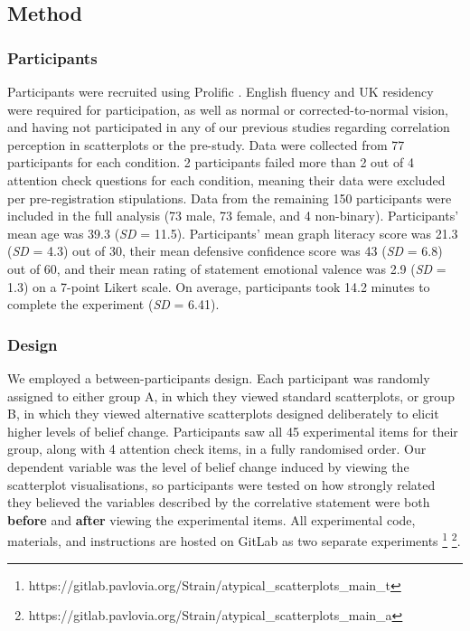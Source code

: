 \documentclass[sigconf]{acmart}
\begin{document}
\subsection{Method}\label{sec-method-main}

\subsubsection{Participants}\label{sec-participants-main}

Participants were recruited using Prolific \citep{prolific}. English
fluency and UK residency were required for participation, as well as
normal or corrected-to-normal vision, and having not participated in any
of our previous studies regarding correlation perception in scatterplots
\citep{strain_2023, strain_2023b, strain_2024} or the pre-study. Data
were collected from 77 participants for each condition. 2 participants
failed more than 2 out of 4 attention check questions for each
condition, meaning their data were excluded per pre-registration
stipulations. Data from the remaining 150 participants were included in
the full analysis (73 male, 73 female, and 4 non-binary). Participants'
mean age was 39.3 (\emph{SD} = 11.5). Participants' mean graph literacy
score was 21.3 (\emph{SD} = 4.3) out of 30, their mean defensive
confidence score was 43 (\emph{SD} = 6.8) out of 60, and their mean
rating of statement emotional valence was 2.9 (\emph{SD} = 1.3) on a
7-point Likert scale. On average, participants took 14.2 minutes to
complete the experiment (\emph{SD} = 6.41).

\subsubsection{Design}\label{sec-design-main}

We employed a between-participants design. Each participant was randomly
assigned to either group A, in which they viewed standard scatterplots,
or group B, in which they viewed alternative scatterplots designed
deliberately to elicit higher levels of belief change. Participants saw
all 45 experimental items for their group, along with 4 attention check
items, in a fully randomised order. Our dependent variable was the level
of belief change induced by viewing the scatterplot visualisations, so
participants were tested on how strongly related they believed the
variables described by the correlative statement were both
\textbf{before} and \textbf{after} viewing the experimental items. All
experimental code, materials, and instructions are hosted on GitLab as
two separate experiments \footnote{https://gitlab.pavlovia.org/Strain/atypical\_scatterplots\_main\_t}
\footnote{https://gitlab.pavlovia.org/Strain/atypical\_scatterplots\_main\_a}.
\end{document}
